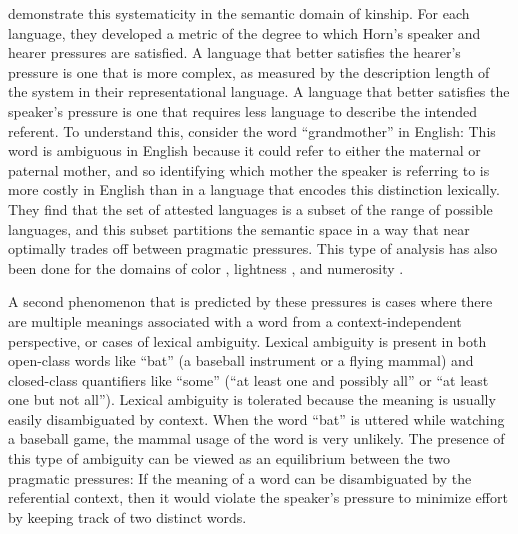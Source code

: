 \documentclass[man]{apa2}
\begin{document}
  demonstrate this systematicity in the semantic domain of kinship. For each language, they developed a metric of the degree to which Horn's speaker and hearer pressures are satisfied. A language that better satisfies the hearer's pressure is one that is more complex, as measured by the description length of the system in their representational language. A language that better satisfies the speaker's pressure is one that requires less language to describe the intended referent. To understand this, consider the word ``grandmother'' in English: This word is ambiguous in English because it could refer to either the maternal or paternal mother, and so identifying which mother the speaker is referring to is more costly in English than in a language that encodes this distinction lexically. They find that the set of attested languages is a subset of the range of possible languages, and this subset partitions the semantic space in a way that near optimally trades off between pragmatic pressures. This type of analysis has also been done for the domains of color \cite{regier2007color}, lightness \cite{baddeley2009}, and numerosity \cite{xu4numeral}.
 
A second phenomenon that is predicted by these pressures is cases where there are multiple meanings associated with a word from a context-independent perspective, or cases of lexical ambiguity. Lexical ambiguity is present in both open-class words like ``bat'' (a baseball instrument or a flying mammal) and closed-class quantifiers like ``some'' (``at least one and possibly all'' or ``at least one but not all''). Lexical ambiguity is tolerated because the meaning is usually easily disambiguated by context. When the word ``bat'' is uttered while watching a baseball game, the mammal usage of the word is very unlikely. The presence of this type of ambiguity can be viewed as an equilibrium between the two pragmatic pressures: If the meaning of a word can be disambiguated by the referential context, then it would violate the speaker's pressure to minimize effort by keeping track of two distinct words.
\end{document}
